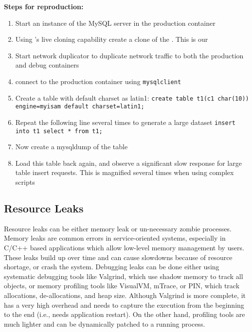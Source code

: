 \noindent \textbf{Steps for reproduction:} \\

\begin{adjustwidth}{0.5cm}{}
	\begin{enumerate}
		\item Start an instance of the MySQL server in the production container
		\item Using \parikshan's live cloning capability create a clone of the \productioncontainer. This is our \debugcontainer
		\item Start network duplicator to duplicate network traffic to both the production and debug containers
		\item connect to the production container using \texttt{mysqlclient}
		\item Create a table with default charset as latin1:
			\texttt{create table t1(c1 char(10)) engine=myisam default charset=latin1;}
		\item Repeat the following line several times to generate a large dataset
			\texttt{insert into t1 select * from t1;}
		\item Now create a mysqldump of the table
		\item Load this table back again, and observe a significant slow response for large table insert requests. This is magnified several times when using complex scripts
	\end{enumerate}
\end{adjustwidth}	



\subsection{Resource Leaks}
Resource leaks can be either memory leak or un-necessary zombie processes.
Memory leaks are common errors in service-oriented systems, especially in C/C++ based applications which allow low-level memory management by users.
These leaks build up over time and can cause slowdowns because of resource shortage, or crash the system.
Debugging leaks can be done either using systematic debugging tools like Valgrind, which use shadow memory to track all objects, or memory profiling tools like VisualVM, mTrace, or PIN, which track allocations, de-allocations, and heap size.
Although Valgrind is more complete, it has a very high overhead and needs to capture the execution from the beginning to the end (i.e., needs application restart).
On the other hand, profiling tools are much lighter and can be dynamically patched to a running process.

